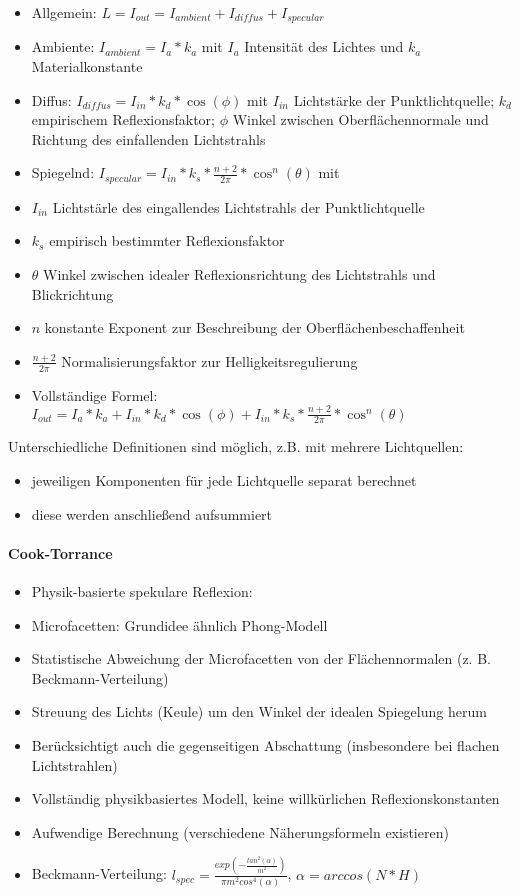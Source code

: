 \documentclass[10pt,landscape]{article}
\begin{document}
\begin{multicols}{3}

\begin{itemize}
  \item Allgemein: $L=I_{out}=I_{ambient}+I_{diffus}+I_{specular}$
  \item Ambiente: $I_{ambient}=I_a * k_a$ mit $I_a$ Intensität des Lichtes und $k_a$ Materialkonstante
  \item Diffus: $I_{diffus}=I_{in}*k_d*\cos(\phi)$ mit $I_{in}$ Lichtstärke der Punktlichtquelle; $k_d$ empirischem Reflexionsfaktor; $\phi$ Winkel zwischen Oberflächennormale und Richtung des einfallenden Lichtstrahls
  \item Spiegelnd: $I_{specular}=I_{in}*k_s*\frac{n+2}{2\pi}*\cos^n({\theta})$ mit
  \item $I_{in}$ Lichtstärle des eingallendes Lichtstrahls der Punktlichtquelle
  \item $k_s$ empirisch bestimmter Reflexionsfaktor
  \item $\theta$ Winkel zwischen idealer Reflexionsrichtung des Lichtstrahls und Blickrichtung
  \item $n$ konstante Exponent zur Beschreibung der Oberflächenbeschaffenheit
  \item $\frac{n+2}{2\pi}$ Normalisierungsfaktor zur Helligkeitsregulierung
  \item Vollständige Formel: $I_{out}=I_a*k_a+I_{in}*k_d*\cos(\phi)+I_{in}*k_s*\frac{n+2}{2\pi}*\cos^n(\theta)$
\end{itemize}
Unterschiedliche Definitionen sind möglich, z.B. mit mehrere Lichtquellen:
\begin{itemize}
  \item jeweiligen Komponenten für jede Lichtquelle separat berechnet
  \item diese werden anschließend aufsummiert
\end{itemize}

\paragraph{Cook-Torrance}
\begin{itemize}
  \item Physik-basierte spekulare Reflexion:
  \item Microfacetten: Grundidee ähnlich Phong-Modell
  \item Statistische Abweichung der Microfacetten von der Flächennormalen (z. B. Beckmann-Verteilung)
  \item Streuung des Lichts (Keule) um den Winkel der idealen Spiegelung herum
  \item Berücksichtigt auch die gegenseitigen Abschattung (insbesondere bei flachen Lichtstrahlen)
  \item Vollständig physikbasiertes Modell, keine willkürlichen Reflexionskonstanten
  \item Aufwendige Berechnung (verschiedene Näherungsformeln existieren)
  \item Beckmann-Verteilung: $l_{spec}=\frac{exp(-\frac{tan^2(\alpha)}{m^2})}{\pi m^2 cos^4 (\alpha)}$, $\alpha=arccos(N*H)$
\end{itemize}


\end{multicols}
\end{document}
